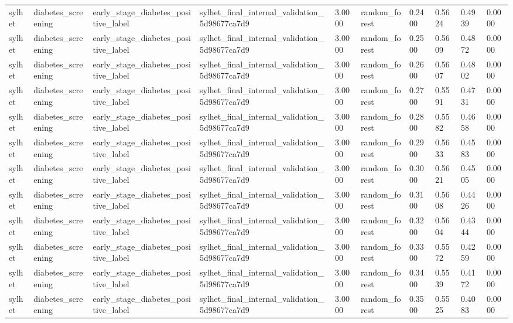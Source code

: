 \begin{tabular}{llllllllll}
sylhet & diabetes\_screening & early\_stage\_diabetes\_positive\_label & sylhet\_final\_internal\_validation\_5d98677ca7d9 & 3.0000 & random\_forest & 0.2400 & 0.5624 & 0.4939 & 0.0000 \\
sylhet & diabetes\_screening & early\_stage\_diabetes\_positive\_label & sylhet\_final\_internal\_validation\_5d98677ca7d9 & 3.0000 & random\_forest & 0.2500 & 0.5609 & 0.4872 & 0.0000 \\
sylhet & diabetes\_screening & early\_stage\_diabetes\_positive\_label & sylhet\_final\_internal\_validation\_5d98677ca7d9 & 3.0000 & random\_forest & 0.2600 & 0.5607 & 0.4802 & 0.0000 \\
sylhet & diabetes\_screening & early\_stage\_diabetes\_positive\_label & sylhet\_final\_internal\_validation\_5d98677ca7d9 & 3.0000 & random\_forest & 0.2700 & 0.5591 & 0.4731 & 0.0000 \\
sylhet & diabetes\_screening & early\_stage\_diabetes\_positive\_label & sylhet\_final\_internal\_validation\_5d98677ca7d9 & 3.0000 & random\_forest & 0.2800 & 0.5582 & 0.4658 & 0.0000 \\
sylhet & diabetes\_screening & early\_stage\_diabetes\_positive\_label & sylhet\_final\_internal\_validation\_5d98677ca7d9 & 3.0000 & random\_forest & 0.2900 & 0.5633 & 0.4583 & 0.0000 \\
sylhet & diabetes\_screening & early\_stage\_diabetes\_positive\_label & sylhet\_final\_internal\_validation\_5d98677ca7d9 & 3.0000 & random\_forest & 0.3000 & 0.5621 & 0.4505 & 0.0000 \\
sylhet & diabetes\_screening & early\_stage\_diabetes\_positive\_label & sylhet\_final\_internal\_validation\_5d98677ca7d9 & 3.0000 & random\_forest & 0.3100 & 0.5608 & 0.4426 & 0.0000 \\
sylhet & diabetes\_screening & early\_stage\_diabetes\_positive\_label & sylhet\_final\_internal\_validation\_5d98677ca7d9 & 3.0000 & random\_forest & 0.3200 & 0.5604 & 0.4344 & 0.0000 \\
sylhet & diabetes\_screening & early\_stage\_diabetes\_positive\_label & sylhet\_final\_internal\_validation\_5d98677ca7d9 & 3.0000 & random\_forest & 0.3300 & 0.5572 & 0.4259 & 0.0000 \\
sylhet & diabetes\_screening & early\_stage\_diabetes\_positive\_label & sylhet\_final\_internal\_validation\_5d98677ca7d9 & 3.0000 & random\_forest & 0.3400 & 0.5539 & 0.4172 & 0.0000 \\
sylhet & diabetes\_screening & early\_stage\_diabetes\_positive\_label & sylhet\_final\_internal\_validation\_5d98677ca7d9 & 3.0000 & random\_forest & 0.3500 & 0.5525 & 0.4083 & 0.0000 \\

\end{tabular}
